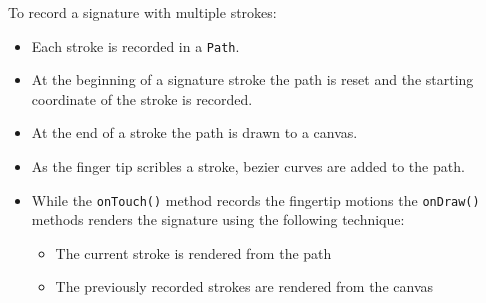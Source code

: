 \documentclass[11pt]{article} %
\begin{document}
To record a signature with multiple strokes:
\begin{itemize}
\item Each stroke is recorded in a \texttt{Path}. 
\item At the beginning of
   a signature stroke the path is reset and the starting coordinate
   of the stroke is recorded.
   
\item At the end of a stroke the path is drawn to a canvas.
    
\item As the finger tip scribles a stroke, bezier curves are added to the 
    path.
    
\item While the \texttt{onTouch()} method records the fingertip motions
   the \texttt{onDraw()} methods renders the signature using the
   following technique:
   \begin{itemize}
   \item The current stroke is rendered from the path
   \item The previously recorded strokes are rendered from the canvas
   \end{itemize}
\end{itemize}
\end{document}
